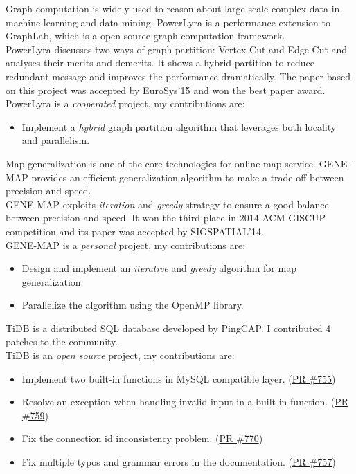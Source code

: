 \documentclass{resume}
\begin{document}
Graph computation is widely used to reason about large-scale complex data in machine learning and data mining. PowerLyra is a performance extension to GraphLab, which is a open source graph computation framework.
\\[5pt]
PowerLyra discusses two ways of graph partition: Vertex-Cut and Edge-Cut and analyses their merits and demerits. It shows a hybrid partition to reduce redundant message and improves the performance dramatically. The paper based on this project was accepted by EuroSys’15 and won the best paper award.
\\[5pt]
PowerLyra is a \textit{cooperated} project, my contributions are:
\begin{itemize}
  \item {Implement a \textit{hybrid} graph partition algorithm that leverages both locality and parallelism.}
\end{itemize}

Map generalization is one of the core technologies for online map service. GENE-MAP provides an efficient generalization algorithm to make a trade off between precision and speed.
\\[5pt]
GENE-MAP exploits \textit{iteration} and \textit{greedy} strategy to ensure a good balance between precision and speed. It won the third place in 2014 ACM GISCUP competition and its paper was accepted by SIGSPATIAL’14.
\\[5pt]
GENE-MAP is a \textit{personal} project, my contributions are:
\begin{itemize}
  \item {Design and implement an \textit{iterative} and \textit{greedy} algorithm for map generalization.}
  \item {Parallelize the algorithm using the OpenMP library.}
\end{itemize}

TiDB is a distributed SQL database developed by PingCAP. I contributed 4 patches to the community.
\\[5pt]
TiDB is an \textit{open source} project, my contributions are:
\begin{itemize}
  \item {Implement two built-in functions in MySQL compatible layer.} (\href{https://github.com/pingcap/tidb/pull/755}{PR \#755})
  \item {Resolve an exception when handling invalid input in a built-in function.} (\href{https://github.com/pingcap/tidb/pull/759}{PR \#759})
  \item {Fix the connection id inconsistency problem.} (\href{https://github.com/pingcap/tidb/pull/770}{PR \#770})
  \item {Fix multiple typos and grammar errors in the documentation.} (\href{https://github.com/pingcap/tidb/pull/757}{PR \#757})
\end{itemize}
\end{document}
